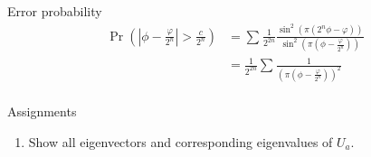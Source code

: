 \documentclass{beamer}
\begin{document}
\begin{frame}{Error probability}
\begin{align*}
\Pr\left(\left|\phi - \frac{\varphi}{2^n}\right| > \frac{c}{2^n}\right)
&=\sum_{} \frac1{2^{2n}}\frac{\sin^2\left(\pi\left(2^n\phi - \varphi\right)\right)}{\sin^2\left(\pi\left(\phi - \frac{\varphi}{2^n}\right)\right)}\\
&= \frac1{2^{2n}}\sum_{}\frac{1}{\left(\pi\left(\phi - \frac{\varphi}{2^n}\right)\right)^2}\\
\end{align*}
\end{frame}
\fi



\begin{frame}{Assignments}
\begin{enumerate}
\setlength{\itemsep}{2em}
\item Show all eigenvectors and corresponding eigenvalues of $U_a$.
\end{enumerate}
\end{frame}
\end{document}

